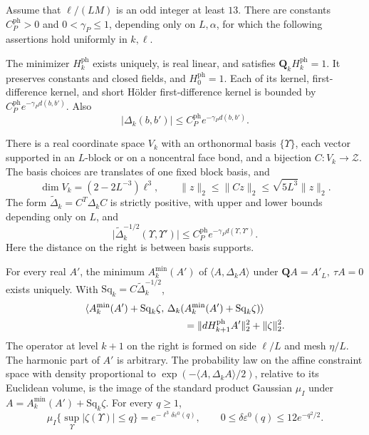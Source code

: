 \documentclass[11pt,letterpaper,reqno]{amsart}
\begin{document}
\begin{theorem}\label{thm:maxwell-block}
Assume that \(\ell/(LM)\) is an odd integer at least \(13\).
There are constants \(C_P^{\mathrm{ph}}>0\) and
\(0<\gamma_P\le1\), depending only on \(L,\alpha\), for which
the following assertions hold uniformly in \(k,\ell\).

The minimizer \(H_k^{\mathrm{ph}}\) exists uniquely, is real
linear, and satisfies \(\mathbf Q_kH_k^{\mathrm{ph}}=1\).
It preserves constants and closed fields, and \(H_0^{\mathrm{ph}}=1\).
Each of its kernel, first-difference kernel, and short H\"older
first-difference kernel is bounded by
\(C_P^{\mathrm{ph}}e^{-\gamma_Pd(b,b')}\).
Also
\[
 |\Delta_k(b,b')|\le C_P^{\mathrm{ph}}e^{-\gamma_Pd(b,b')}.
\]

There is a real coordinate space \(V_k\) with an orthonormal
basis \(\{\Upsilon\}\), each vector supported in an \(L\)-block
or on a noncentral face bond, and a bijection \(C:V_k\to\mathcal Z\).
The basis choices are translates of one fixed block basis, and
\[
 \dim V_k=(2-2L^{-3})\ell^3,\qquad
 \|z\|_2\le\|Cz\|_2\le\sqrt{5L^3}\|z\|_2.
\]
The form \(\widetilde\Delta_k=C^T\Delta_kC\) is strictly positive,
with upper and lower bounds depending only on \(L\), and
\[
 \big|\widetilde\Delta_k^{-1/2}(\Upsilon,\Upsilon')\big|
 \le C_P^{\mathrm{ph}}e^{-\gamma_Pd(\Upsilon,\Upsilon')}.
\]
Here the distance on the right is between basis supports.

For every real \(A'\), the minimum \(A_k^{\min}(A')\) of
\(\langle A,\Delta_kA\rangle\) under
\(\mathbf QA=A'_L,\ \tau A=0\) exists uniquely. With
\(\mathrm{Sq}_k=C\widetilde\Delta_k^{-1/2}\),
\begin{equation}\label{eq:main-block-split}
 \begin{split}
 &\langle A_k^{\min}(A')+\mathrm{Sq}_k\zeta,\,
   \Delta_k(A_k^{\min}(A')+\mathrm{Sq}_k\zeta)\rangle\\
 &\hspace{35mm}=\|dH_{k+1}^{\mathrm{ph}}A'\|_2^2+\|\zeta\|_2^2.
 \end{split}
\end{equation}
The operator at level \(k+1\) on the right is formed on side
\(\ell/L\) and mesh \(\eta/L\). The harmonic part of \(A'\)
is arbitrary. The probability law on the affine constraint space
with density proportional to
\(\exp(-\langle A,\Delta_kA\rangle/2)\), relative to its Euclidean
volume, is the image of the standard product Gaussian \(\mu_I\)
under \(A=A_k^{\min}(A')+\mathrm{Sq}_k\zeta\).
For every \(q\ge1\),
\[
 \mu_I\{\sup_\Upsilon|\zeta(\Upsilon)|\le q\}
   =e^{-\ell^3\delta\varepsilon^0(q)},\qquad
 0\le\delta\varepsilon^0(q)\le12e^{-q^2/2}.
\]


\end{theorem}
\end{document}
